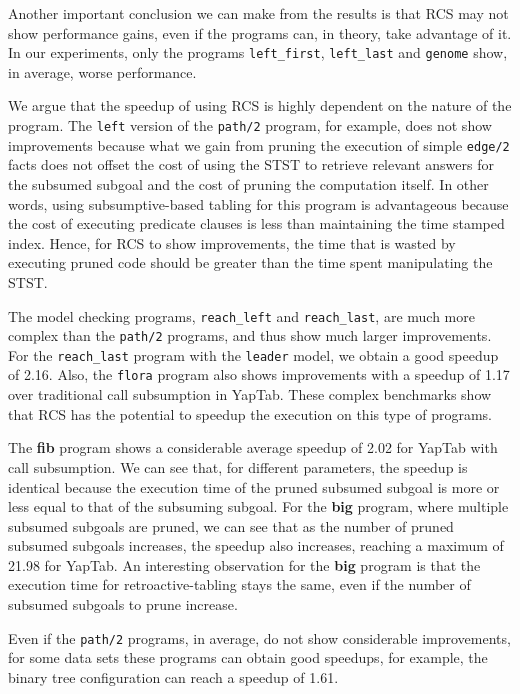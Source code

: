 Another important conclusion we can make from the results is that RCS may not show performance gains, even if the
programs can, in theory, take advantage of it. In our experiments, only the programs \texttt{left\_first},
\texttt{left\_last} and \texttt{genome} show, in average, worse performance.

We argue that the speedup of using RCS is highly dependent on the nature of the program.
The \texttt{left} version
of the \texttt{path/2} program, for example, does not show improvements because what we gain from pruning the
execution of simple \texttt{edge/2} facts does not offset the cost of using the STST to retrieve relevant answers
for the subsumed subgoal and
the cost of pruning the computation itself. In other words, using subsumptive-based tabling for this program is
advantageous because the cost of executing predicate clauses is less than maintaining the time stamped index.
Hence, for RCS to show improvements, the time that is wasted by executing pruned code should be greater than the
time spent manipulating the STST.

The model checking programs, \texttt{reach\_left} and \texttt{reach\_last}, are much more complex than the \texttt{path/2}
programs, and thus show much larger improvements. For the \texttt{reach\_last} program with the \texttt{leader} model,
we obtain a good speedup of 2.16. Also, the \texttt{flora} program also shows improvements with a speedup of 1.17 over
traditional call subsumption in YapTab. These complex benchmarks show that RCS has the potential to speedup the
execution on this type of programs.

The \textbf{fib} program shows a considerable average speedup of 2.02 for YapTab with call subsumption.
We can see that, for different parameters, the speedup is identical because the execution time of the pruned subsumed
subgoal is more or less equal to that of the subsuming subgoal. For the \textbf{big} program, where multiple
subsumed subgoals are pruned, we can see that as the number of pruned subsumed subgoals increases, the speedup
also increases, reaching a maximum of 21.98 for YapTab. An interesting observation for the \textbf{big} program is
that the execution time for retroactive-tabling stays the same, even if the number of subsumed subgoals to prune
increase.

Even if the \texttt{path/2} programs, in average, do not show considerable improvements, for some data sets
these programs can obtain good speedups, for example, the binary tree configuration can reach a speedup of 1.61.

